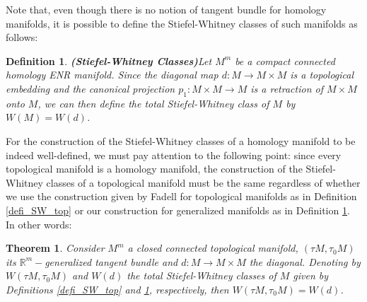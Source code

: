 \documentclass[12pt,oneside]{book}
\newtheorem{defi}   {Definition}[chapter]
\newtheorem{teo}    {Theorem}[chapter]
\newcommand{\R}{\mathbb{R}}
\begin{document}
    Note that, even though there is no notion of tangent bundle for homology manifolds, it is possible to define the Stiefel-Whitney classes 
    of such manifolds as follows:

    \begin{defi}{\bf (Stiefel-Whitney Classes)}\label{defi_SW_hom}
        Let $M^{m}$ be a compact connected homology ENR manifold. Since the diagonal map $d:M\to M\times M$ is a 
        topological embedding and the canonical projection $p_{1}:M\times M\to M$ is a retraction 
        of $M\times M$ onto $M$, we can then define the total Stiefel-Whitney class of $M$ by $W(M)=W(d)$.
    \end{defi}

    For the construction of the Stiefel-Whitney classes of a homology manifold to be indeed well-defined, we must pay 
    attention to the following point: since every topological manifold is a homology manifold, the construction of the Stiefel-Whitney classes 
    of a topological manifold must be the same regardless of whether we use the construction given by Fadell for topological 
    manifolds as in Definition \ref{defi_SW_top} or our construction for generalized manifolds as in 
    Definition \ref{defi_SW_hom}. In other words:

    \begin{teo}\label{SW_tang_gen}
    	Consider $M^{m}$ a closed connected topological manifold, $(\tau M,\tau_{0}M)$ its $\R^{m}-$generalized tangent 
        bundle and $d:M\to M\times M$ the diagonal. Denoting by $W(\tau M,\tau_{0}M)$ 
        and $W(d)$ the total Stiefel-Whitney classes of $M$ given by Definitions \ref{defi_SW_top} and 
        \ref{defi_SW_hom}, respectively, then $W(\tau M,\tau_{0}M)=W(d)$.
    \end{teo}
\end{document}
